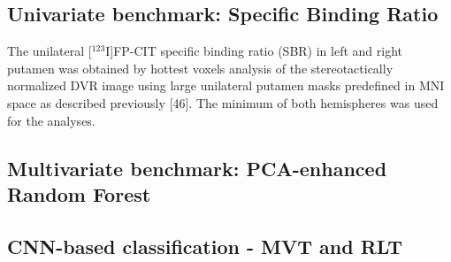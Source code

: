 

\subsection{Univariate benchmark: Specific Binding Ratio}
\label{subsec:sbr}


The unilateral [$^{123}$I]FP-CIT specific binding ratio (SBR) in left and right putamen was obtained by hottest voxels analysis 
of the stereotactically normalized DVR image using large unilateral putamen masks predefined in MNI space as described previously [46]. 
The minimum of both hemispheres was used for the analyses.


\subsection{Multivariate benchmark: PCA-enhanced Random Forest}
\label{subsec:pca_rfc}


\subsection{CNN-based classification - MVT and RLT}
\label{subsec:cnn_based_classification}



